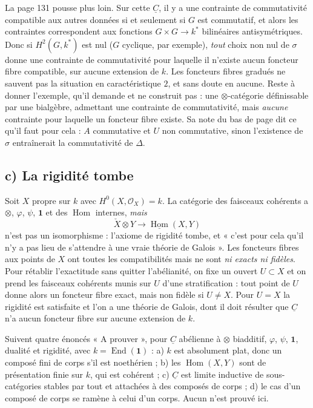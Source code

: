 \documentclass[11pt,a4paper]{article}
\begin{document}
La page 131 pousse plus loin. Sur cette $\underline{C}$, il y a une contrainte
de commutativité compatible aux autres données si et seulement si $G$ est
commutatif, et alors les contraintes correspondent aux fonctions $G \times G
\to k^{*}$ bilinéaires antisymétriques. Donc si $H^{2}(G, k^{*})$ est nul
($G$ cyclique, par exemple), \emph{tout} choix non nul de $\sigma$ donne une
contrainte de commutativité pour laquelle il n'existe aucun foncteur fibre
compatible, sur aucune extension de $k$. Les foncteurs fibres gradués ne
sauvent pas la situation en caractéristique $2$, et sans doute en aucune. Reste
à donner l'exemple, qu'il demande et ne construit pas : une
$\otimes$-catégorie définissable par une bialgèbre, admettant une contrainte de
commutativité, mais \emph{aucune} contrainte pour laquelle un foncteur fibre
existe. Sa note du bas de page dit ce qu'il faut pour cela : $A$ commutative et
$U$ non commutative, sinon l'existence de $\sigma$ entraînerait la
commutativité de $\Delta$.

\subsection*{c) La rigidité tombe}

Soit $X$ propre sur $k$ avec $H^{0}(X, \mathcal{O}_{X}) = k$. La catégorie des
faisceaux cohérents a $\otimes$, $\varphi$, $\psi$, $\mathbf{1}$ et des
$\operatorname{Hom}$ internes, \emph{mais}
\[
\check{X} \otimes Y \longrightarrow
\underline{\operatorname{Hom}}(X,Y)
\]
n'est pas un isomorphisme : l'axiome de rigidité tombe, et « c'est pour cela
qu'il n'y a pas lieu de s'attendre à une vraie théorie de Galois ». Les
foncteurs fibres aux points de $X$ ont toutes les compatibilités mais ne sont
\emph{ni exacts ni fidèles}. Pour rétablir l'exactitude sans quitter
l'abélianité, on fixe un ouvert $U \subset X$ et on prend les faisceaux
cohérents munis sur $U$ d'une stratification : tout point de $U$ donne alors un
foncteur fibre exact, mais non fidèle si $U \neq X$. Pour $U = X$ la
rigidité est satisfaite et l'on a une théorie de Galois, dont il doit résulter
que $\underline{C}$ n'a aucun foncteur fibre sur aucune extension de $k$.

Suivent quatre énoncés « A prouver », pour $\underline{C}$ abélienne à
$\otimes$ biadditif, $\varphi$, $\psi$, $\mathbf{1}$, dualité et rigidité, avec
$k = \operatorname{End}(\mathbf{1})$ : a) $k$ est absolument plat, donc un
composé fini de corps s'il est noethérien ; b) les
$\operatorname{Hom}(X,Y)$ sont de présentation finie sur $k$, qui est cohérent ;
c) $\underline{C}$ est limite inductive de sous-catégories stables par tout et
attachées à des composés de corps ; d) le cas d'un composé de corps se ramène à
celui d'un corps. Aucun n'est prouvé ici.
\end{document}
